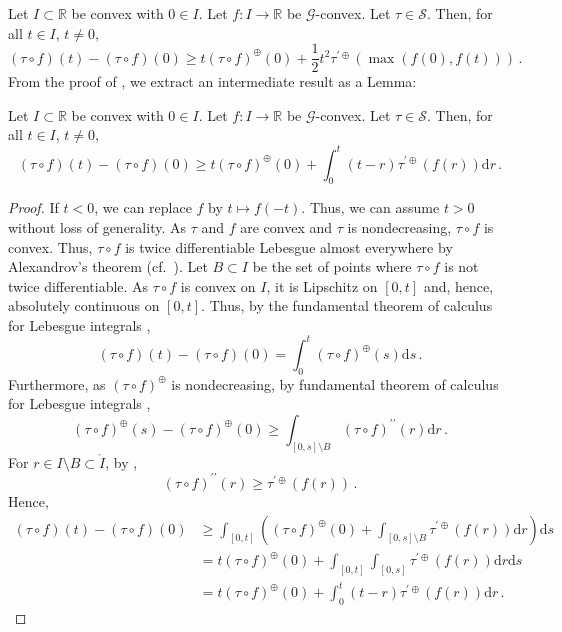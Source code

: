 \documentclass{article}
\newcommand*{\mc}[1]{\mathcal{#1}}
\newcommand{\R}{\mathbb{R}}
\newcommand{\lb}{\left(} %
\newcommand{\rb}{\right)} %
\newcommand{\br}[1]{\lb #1 \rb} %
\newcommand{\brOf}[1]{\!\br{#1}} %
\newcommand{\prr}{^{\prime\prime}}
\newcommand{\eqfs}{\,.}
\newcommand{\dl}{\mathrm{d}} %
\newcommand{\tran}{\tau}
\newcommand{\ddrtran}{\tau^{\prime\oplus}}
\newcommand{\setcc}{\mc S}
\newcommand{\rd}{^\oplus}
\begin{document}
Let $I\subset \R$ be convex with $0\in I$.
Let $f\colon I\to\R$ be $\mc G$-convex.
Let $\tran\in\setcc$.
Then, for all $t\in I$, $t\neq0$,
\begin{equation}
    (\tran \circ f)(t) - (\tran \circ f)(0) \geq t (\tran \circ f)\rd(0) + \frac12 t^2 \ddrtran\brOf{\max\brOf{f(0), f(t)}}
    \eqfs
\end{equation}
%
From the proof of \cite[Theorem 4.17 (ii)]{varinequ}, we extract an intermediate result as a Lemma:
%
\begin{lemma}\label{lmm:semitaylor}
    Let $I\subset \R$ be convex with $0\in I$.
    Let $f\colon I\to\R$ be $\mc G$-convex.
    Let $\tran\in\setcc$.
    Then, for all $t\in I$, $t\neq0$,
    \begin{equation}\label{eq:semitaylor:tran}
        (\tran \circ f)(t) - (\tran \circ f)(0) \geq t (\tran \circ f)\rd(0) + \int_{0}^t (t-r) \ddrtran(f(r)) \dl r
        \eqfs
    \end{equation}
\end{lemma}
%
\begin{proof}
    If $t<0$, we can replace $f$ by $t\mapsto f(-t)$. Thus, we can assume $t>0$ without loss of generality.
    As $\tran$ and $f$ are convex and $\tran$ is nondecreasing, $\tran \circ f$ is convex. Thus, $\tran \circ f$ is twice differentiable Lebesgue almost everywhere by Alexandrov's theorem (cf.\ \cite[Lemma A.2]{varinequ}). Let $B\subset I$ be the set of points where $\tran \circ f$ is not twice differentiable.
    As $\tran \circ f$ is convex on $I$, it is Lipschitz on $[0, t]$ and, hence, absolutely continuous on $[0, t]$. Thus, by the fundamental theorem of calculus for Lebesgue integrals \cite[Lemma A.1]{varinequ},
    \begin{equation}
        (\tran \circ f)(t) - (\tran \circ f)(0) = \int_0^t (\tran \circ f)\rd(s) \dl s
        \eqfs
    \end{equation}
    Furthermore, as $(\tran \circ f)\rd$ is nondecreasing, by fundamental theorem of calculus for Lebesgue integrals \cite[Lemma A.1]{varinequ},
    \begin{equation}
        (\tran \circ f)\rd(s) - (\tran \circ f)\rd(0) \geq \int_{[0,s]\setminus B} (\tran \circ f)\prr(r) \dl r
        \eqfs
    \end{equation}
    For $r \in I\setminus B \subset \mathring I$, by \cite[Lemma 4.16]{varinequ},
    \begin{equation}
        (\tran \circ f)\prr(r) \geq \ddrtran(f(r))
        \eqfs
    \end{equation}
    Hence,
    \begin{align}
        (\tran \circ f)(t) - (\tran \circ f)(0)
        &\geq
        \int_{[0,t]} \br{  (\tran \circ f)\rd(0) + \int_{[0,s]\setminus B} \ddrtran(f(r)) \dl r } \dl s
        \\&=
        t (\tran \circ f)\rd(0) + \int_{[0,t]} \int_{[0,s]} \ddrtran(f(r)) \dl r  \dl s
        \\&=
        t (\tran \circ f)\rd(0) + \int_{0}^t (t-r) \ddrtran(f(r)) \dl r
        \eqfs
    \end{align}
\end{proof}
\end{document}
